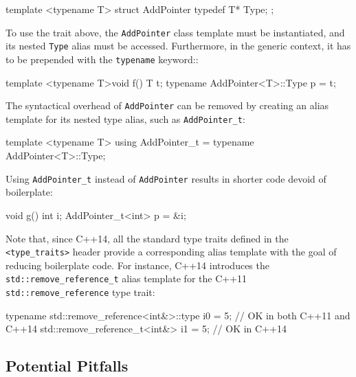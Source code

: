\begin{emcppslisting}[language=C++]
template <typename T>
struct AddPointer
{
    typedef T* Type;
};
\end{emcppslisting}
    
\noindent To use the trait above, the \lstinline!AddPointer! class template must be instantiated, and its nested
\lstinline!Type! alias must be accessed. Furthermore, in the generic context, it has to be prepended with the \lstinline!typename! keyword::

\begin{emcppslisting}[language=C++]
template <typename T>void f()
{
    T t;
    typename AddPointer<T>::Type p = t;
}
\end{emcppslisting}
    
\noindent The syntactical overhead of \lstinline!AddPointer! can be removed by
creating an alias template for its nested type alias, such as
\lstinline!AddPointer_t!:

\begin{emcppslisting}[language=C++]
template <typename T>
using AddPointer_t = typename AddPointer<T>::Type;
\end{emcppslisting}
          
\noindent Using \lstinline!AddPointer_t! instead of \lstinline!AddPointer! results in
shorter code devoid of boilerplate:

\begin{emcppslisting}[language=C++]
void g()
{
    int i;
    AddPointer_t<int> p = &i;
}
\end{emcppslisting}

\noindent Note that, since C++14, all
the standard type traits defined in the \lstinline!<type_traits>! header
provide a corresponding alias template with the goal of reducing
boilerplate code. For instance, C++14 introduces the
\lstinline!std::remove_reference_t! alias template for the C++11
\lstinline!std::remove_reference! type trait:

\begin{emcppslisting}[language=C++]
typename std::remove_reference<int&>::type i0 = 5; // OK in both C++11 and C++14
std::remove_reference_t<int&> i1 = 5;              // OK in C++14
\end{emcppslisting}
    

\subsection[Potential Pitfalls]{Potential Pitfalls}\label{potential-pitfalls}

